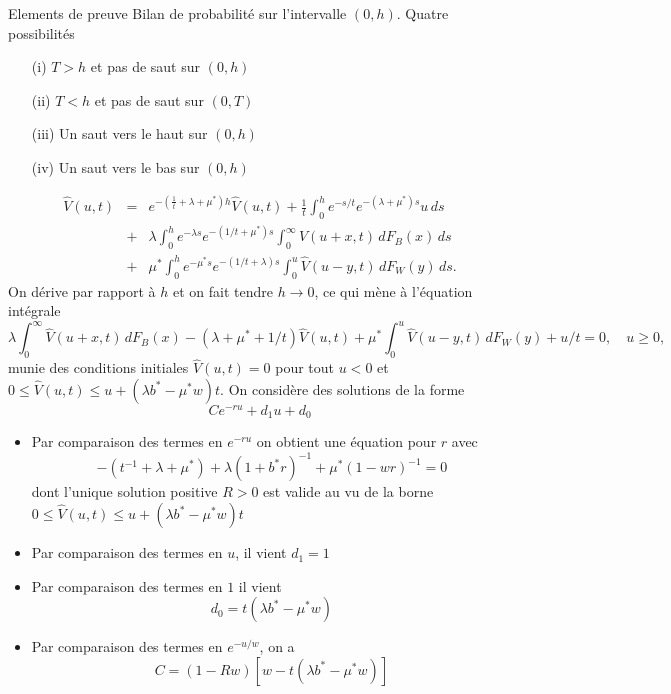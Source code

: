 \documentclass{beamer}
\def \w{\widehat}
\begin{document}
\begin{frame}[allowframebreaks]{Elements de preuve}
\scriptsize
Bilan de probabilité sur l'intervalle $(0,h)$. Quatre possibilités
\begin{itemize}
  \item[(i)] $T>h$ et pas de saut sur $(0,h)$
  \item[(ii)] $T<h$ et pas de saut sur $(0,T)$
  \item[(iii)] Un saut vers le haut sur $(0,h)$
  \item[(iv)] Un saut vers le bas sur $(0,h)$
\end{itemize}
  \begin{eqnarray*}\label{neu0}
      \w{V}(u,t)&=& e^{-(\frac{1}{t}+\lambda+\mu^\ast)h}\w{V}(u,t) + \frac{1}{t}\int_0^h e^{-{s}/{t}}e^{-(\lambda +\mu^\ast) s} u\,ds\\
      & +& \lambda\int_0^he^{-\lambda s} e^{-({1}/{t}+\mu^\ast) s} \int_0^\infty\w{V}(u+x,t)\,dF_{B}(x)\,ds\\
      &  +&\mu^\ast \int_0^he^{-\mu^\ast s} e^{-({1}/{t}+\lambda) s}\int_0^u \w{V}(u-y,t) \,dF_W(y)\,ds.
  \end{eqnarray*}
  On dérive par rapport à $h$ et on fait tendre $h\rightarrow 0$, ce qui mène à l'équation intégrale
  \begin{equation} \label{inteq}
    \lambda\int_0^\infty\w{V}(u+x,t)\,dF_{B}(x)-(\lambda+\mu^\ast+{1}/{t})\w{V}(u,t)+\mu^\ast\int_0^u \w{V}(u-y,t) \,dF_W(y)+{u}/{t}=0,\quad u\ge 0,
  \end{equation}
  munie des conditions initiales $\w{V}(u,t)=0$ pour tout $u<0$ et $0\leq\w{V}(u,t)\leq u+(\lambda b^\ast - \mu^\ast w)t$. On considère des solutions de la forme
  $$
  Ce^{-ru}+d_1u+d_0
  $$
  \begin{itemize}
    \item Par comparaison des termes en $e^{-r u}$ on obtient une équation pour $r$ avec
    $$
    -(t^{-1}+\lambda+\mu^\ast)+\lambda(1+b^\ast r)^{-1}+\mu^\ast(1-wr)^{-1}=0
    $$
    dont l'unique solution positive $R>0$ est valide au vu de la borne $0\leq\w{V}(u,t)\leq u+(\lambda b^\ast - \mu^\ast w)t$
    \item Par comparaison des termes en $u$, il vient $d_1 = 1$
    \item Par comparaison des termes en $1$ il vient
    $$
    d_0 = t(\lambda b^\ast-\mu^\ast w)
    $$
    \item Par comparaison des termes en $e^{-u/w}$, on a
    $$
    C = (1 - Rw)[w-t(\lambda b^\ast-\mu^\ast w)]
    $$
  \end{itemize}
\end{frame}
\end{document}

